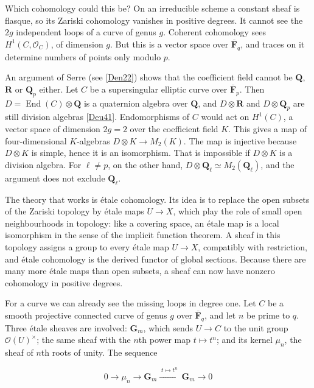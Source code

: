 \documentclass[11pt]{article}
\begin{document}
Which cohomology could this be? On an irreducible scheme a constant sheaf is flasque, so its Zariski cohomology vanishes in positive degrees. It cannot see the \(2g\) independent loops of a curve of genus \(g\). Coherent cohomology sees \(H^1(C,\mathcal O_C)\), of dimension \(g\). But this is a vector space over \(\overline{\mathbf F}_q\), and traces on it determine numbers of points only modulo \(p\).

An argument of Serre (see [\hyperref[bp23]{Den22}]) shows that the coefficient field cannot be \(\mathbf Q\), \(\mathbf R\) or \(\mathbf Q_p\) either. Let \(C\) be a supersingular elliptic curve over \(\overline{\mathbf F}_p\). Then \(D=\operatorname{End}(C)\otimes\mathbf Q\) is a quaternion algebra over \(\mathbf Q\), and \(D\otimes\mathbf R\) and \(D\otimes\mathbf Q_p\) are still division algebras [\hyperref[bp24]{Deu41}]. Endomorphisms of \(C\) would act on \(H^1(C)\), a vector space of dimension \(2g=2\) over the coefficient field \(K\). This gives a map of four-dimensional \(K\)-algebras \(D\otimes K\to M_2(K)\). The map is injective because \(D\otimes K\) is simple, hence it is an isomorphism. That is impossible if \(D\otimes K\) is a division algebra. For \(\ell\neq p\), on the other hand, \(D\otimes\mathbf Q_\ell\simeq M_2(\mathbf Q_\ell)\), and the argument does not exclude \(\mathbf Q_\ell\).

The theory that works is étale cohomology. Its idea is to replace the open subsets of the Zariski topology by étale maps \(U\to X\), which play the role of small open neighbourhoods in topology: like a covering space, an étale map is a local isomorphism in the sense of the implicit function theorem. A sheaf in this topology assigns a group to every étale map \(U\to X\), compatibly with restriction, and étale cohomology is the derived functor of global sections. Because there are many more étale maps than open subsets, a sheaf can now have nonzero cohomology in positive degrees.

For a curve we can already see the missing loops in degree one. Let \(C\) be a smooth projective connected curve of genus \(g\) over \(\overline{\mathbf F}_q\), and let \(n\) be prime to \(q\). Three étale sheaves are involved: \(\mathbf G_m\), which sends \(U\to C\) to the unit group \(\mathcal O(U)^\times\); the same sheaf with the \(n\)th power map \(t\mapsto t^n\); and its kernel \(\mu_n\), the sheaf of \(n\)th roots of unity. The sequence

\[
0\to\mu_n\to\mathbf G_m\xrightarrow{\;t\mapsto t^n\;}\mathbf G_m\to0
\]
\end{document}
